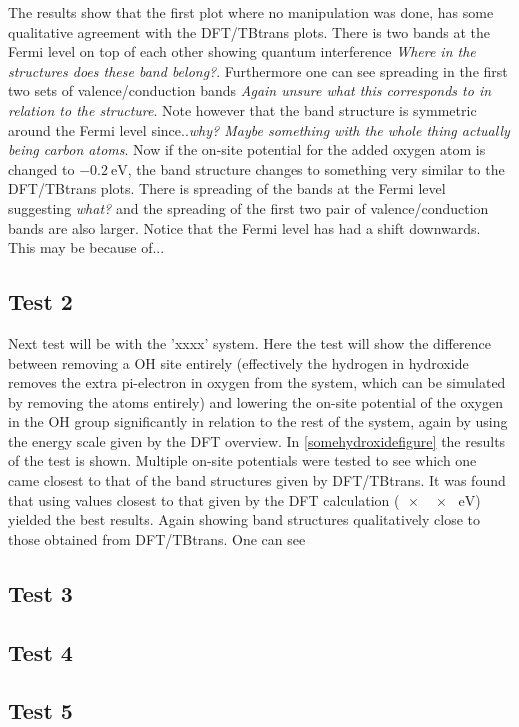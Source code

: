 The results show that the first plot where no manipulation was done, has some qualitative agreement with the DFT/TBtrans plots. There is two bands at the Fermi level on top of each other showing quantum interference \textit{Where in the structures does these band belong?}. Furthermore  one can see spreading in the first two sets of valence/conduction bands \textit{Again unsure what this corresponds to in relation to the structure}. Note however that the band structure is symmetric around the Fermi level since..\textit{why? Maybe something with the whole thing actually being carbon atoms}. Now if the on-site potential for the added oxygen atom is changed to \(\SI{-0.2}{\electronvolt}\), the band structure changes to something very similar to the DFT/TBtrans plots. There is spreading of the bands at the Fermi level suggesting \textit{what?} and the spreading of the first two pair of valence/conduction bands are also larger. Notice that the Fermi level has had a shift downwards. This may be because of... 
\subsection{Test 2}
Next test will be with the 'xxxx' system. Here the test will show the difference between removing a OH site entirely (effectively the hydrogen in hydroxide removes the extra pi-electron in oxygen from the system, which can be simulated by removing the atoms entirely) and lowering the on-site potential of the oxygen in the OH group significantly in relation to the rest of the system, again by using the energy scale given by the DFT overview. In \cref{somehydroxidefigure} the results of the test is shown. Multiple on-site potentials were tested to see which one came closest to that of the band structures given by DFT/TBtrans. It was found that using values closest to that given by the DFT calculation (\(\SI{xx}{\electronvolt}\)) yielded the best results. Again showing band structures qualitatively close to those obtained from DFT/TBtrans. One can see 
\subsection{Test 3}
\subsection{Test 4}
\subsection{Test 5}
